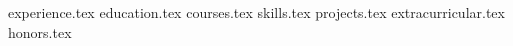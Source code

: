 \documentclass[12pt, a4paper]{awesome-cv}
\newcommand*{\sectiondir}{resume/}
\begin{document}
\makecvheader

{experience.tex}
{education.tex}
{courses.tex}
{skills.tex}
{projects.tex}
{extracurricular.tex}
{honors.tex}
\end{document}
